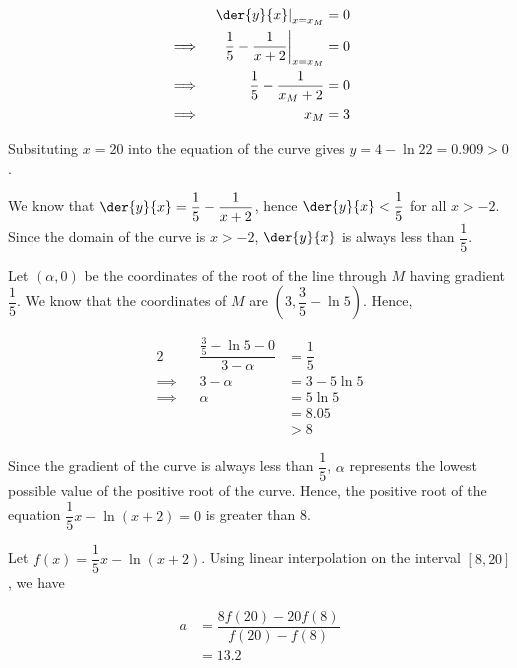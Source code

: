 \documentclass{jhwhw}
\begin{document}
        \begin{alignat*}{2}
            &&\left. \der{y}{x} \right|_{x = x_M} &= 0\\
            \implies&& \left. \dfrac15 - \dfrac1{x+2}\right|_{x = x_M} &= 0 \\
            \implies&& \dfrac15 - \dfrac1{x_M+2} &= 0 \\
            \implies&& x_M &= 3
        \end{alignat*}


        Subsituting $x=20$ into the equation of the curve gives $y = 4 - \ln{22} = 0.909 > 0$.

        We know that $\der{y}{x} = \dfrac15 - \dfrac1{x+2}$, hence $\der{y}{x} < \dfrac15$ for all $x > -2$. Since the domain of the curve is $x > -2$, $\der{y}{x}$ is always less than $\dfrac15$.

        Let $(\alpha, 0)$ be the coordinates of the root of the line through $M$ having gradient $\dfrac15$. We know that the coordinates of $M$ are $(3, \dfrac35 - \ln5)$. Hence,

        \begin{alignat*}{2}
            &&\dfrac{\tfrac35 - \ln5 - 0}{3 - \alpha} &= \dfrac15 \\
            \implies&& 3 - \alpha &= 3 - 5\ln5 \\
            \implies&& \alpha &= 5\ln5 \\
            && &= 8.05 \\
            && &> 8
        \end{alignat*}

        Since the gradient of the curve is always less than $\dfrac15$, $\alpha$ represents the lowest possible value of the positive root of the curve. Hence, the positive root of the equation $\dfrac15 x - \ln(x+2) = 0$ is greater than 8.

        Let $f(x) = \dfrac15 x - \ln(x+2)$. Using linear interpolation on the interval $[8, 20]$, we have

        \begin{equation*}
            \begin{aligned}
                a &= \dfrac{8f(20) - 20f(8)}{f(20) - f(8)} \\
                &= 13.2
            \end{aligned}
        \end{equation*}

\end{document}

